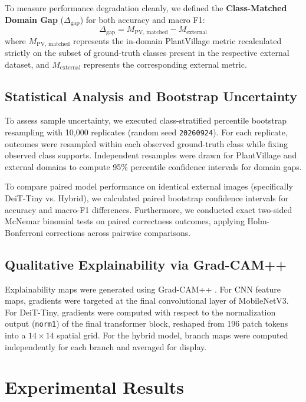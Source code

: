 \documentclass[10pt,journal,compsoc]{IEEEtran}
\begin{document}
To measure performance degradation cleanly, we defined the \textbf{Class-Matched Domain Gap} ($\Delta_{\text{gap}}$) for both accuracy and macro F1:
\begin{equation}
\Delta_{\text{gap}} = M_{\text{PV, matched}} - M_{\text{external}}
\end{equation}
where $M_{\text{PV, matched}}$ represents the in-domain PlantVillage metric recalculated strictly on the subset of ground-truth classes present in the respective external dataset, and $M_{\text{external}}$ represents the corresponding external metric.

\subsection{Statistical Analysis and Bootstrap Uncertainty}
To assess sample uncertainty, we executed class-stratified percentile bootstrap resampling with 10,000 replicates (random seed \texttt{20260924}). For each replicate, outcomes were resampled within each observed ground-truth class while fixing observed class supports. Independent resamples were drawn for PlantVillage and external domains to compute 95\% percentile confidence intervals for domain gaps.

To compare paired model performance on identical external images (specifically DeiT-Tiny vs. Hybrid), we calculated paired bootstrap confidence intervals for accuracy and macro-F1 differences. Furthermore, we conducted exact two-sided McNemar binomial tests on paired correctness outcomes, applying Holm-Bonferroni corrections across pairwise comparisons.

\subsection{Qualitative Explainability via Grad-CAM++}
Explainability maps were generated using Grad-CAM++ \cite{chattopadhay2018}. For CNN feature maps, gradients were targeted at the final convolutional layer of MobileNetV3. For DeiT-Tiny, gradients were computed with respect to the normalization output (\texttt{norm1}) of the final transformer block, reshaped from 196 patch tokens into a $14 \times 14$ spatial grid. For the hybrid model, branch maps were computed independently for each branch and averaged for display.

\section{Experimental Results}
\end{document}
